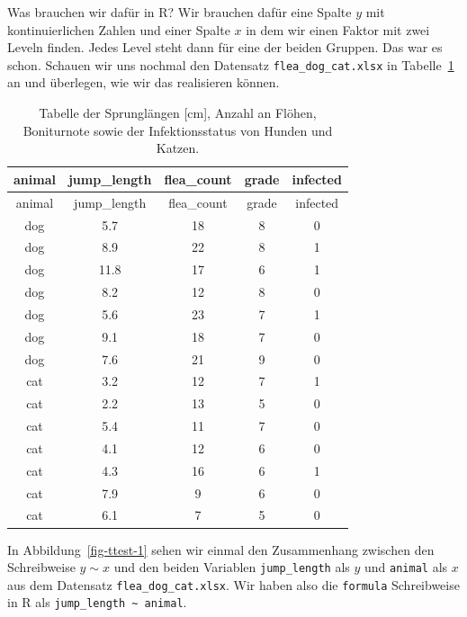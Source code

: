\documentclass[
  letterpaper,
  DIV=11,
  oneside]{scrreport}
\begin{document}
Was brauchen wir dafür in R? Wir brauchen dafür eine Spalte \(y\) mit
kontinuierlichen Zahlen und einer Spalte \(x\) in dem wir einen Faktor
mit zwei Leveln finden. Jedes Level steht dann für eine der beiden
Gruppen. Das war es schon. Schauen wir uns nochmal den Datensatz
\texttt{flea\_dog\_cat.xlsx} in Tabelle~\ref{tbl-data-ttest} an und
überlegen, wie wir das realisieren können.

\hypertarget{tbl-data-ttest}{}
\begin{longtable}[]{@{}ccccc@{}}
\caption{\label{tbl-data-ttest}Tabelle der Sprunglängen {[}cm{]}, Anzahl
an Flöhen, Boniturnote sowie der Infektionsstatus von Hunden und
Katzen.}\tabularnewline
\toprule()
animal & jump\_length & flea\_count & grade & infected \\
\midrule()
\endfirsthead
\toprule()
animal & jump\_length & flea\_count & grade & infected \\
\midrule()
\endhead
dog & 5.7 & 18 & 8 & 0 \\
dog & 8.9 & 22 & 8 & 1 \\
dog & 11.8 & 17 & 6 & 1 \\
dog & 8.2 & 12 & 8 & 0 \\
dog & 5.6 & 23 & 7 & 1 \\
dog & 9.1 & 18 & 7 & 0 \\
dog & 7.6 & 21 & 9 & 0 \\
cat & 3.2 & 12 & 7 & 1 \\
cat & 2.2 & 13 & 5 & 0 \\
cat & 5.4 & 11 & 7 & 0 \\
cat & 4.1 & 12 & 6 & 0 \\
cat & 4.3 & 16 & 6 & 1 \\
cat & 7.9 & 9 & 6 & 0 \\
cat & 6.1 & 7 & 5 & 0 \\
\bottomrule()
\end{longtable}

In Abbildung~\ref{fig-ttest-1} sehen wir einmal den Zusammenhang
zwischen den Schreibweise \(y \sim x\) und den beiden Variablen
\texttt{jump\_length} als \(y\) und \texttt{animal} als \(x\) aus dem
Datensatz \texttt{flea\_dog\_cat.xlsx}. Wir haben also die
\texttt{formula} Schreibweise in R als
\texttt{jump\_length\ \textasciitilde{}\ animal}.
\end{document}
